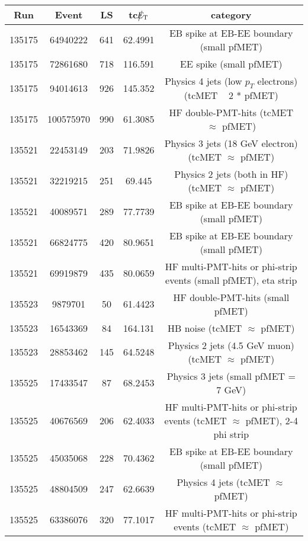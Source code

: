 \begin{table}[htbp]
  \begin{center}
    \begin{tabular}{|c|c|c|c|c|}
      \hline
      Run & Event & LS & tc$\big\slash\hspace{-1.6ex}{E_\text{T}}$ & category \\     
      \hline
      135175  & 64940222     & 641  &    62.4991 & EB spike at EB-EE boundary (small pfMET) \\
      135175  & 72861680     & 718  &    116.591 & EE spike (small pfMET) \\
      135175  & 94014613     & 926  &    145.352 & Physics 4 jets (low $p_T$ electrons) (tcMET ~ 2 * pfMET) \\
      135175  & 100575970    & 990  &    61.3085 & HF double-PMT-hits (tcMET $\approx$ pfMET) \\
      135521  & 22453149     & 203  &    71.9826 & Physics 3 jets (18 GeV electron)(tcMET $\approx$ pfMET) \\
      135521  & 32219215     & 251  &    69.445  & Physics 2 jets (both in HF) (tcMET $\approx$ pfMET) \\
      135521  & 40089571     & 289  &    77.7739 & EB spike at EB-EE boundary (small pfMET) \\
      135521  & 66824775     & 420  &    80.9651 & EB spike at EB-EE boundary (small pfMET) \\
      135521  & 69919879     & 435  &    80.0659 & HF multi-PMT-hits or phi-strip events (small pfMET), eta strip \\
      135523  & 9879701      & 50   &    61.4423 & HF double-PMT-hits (small pfMET) \\
      135523  & 16543369     & 84   &    164.131 & HB noise (tcMET $\approx$ pfMET) \\
      135523  & 28853462     & 145  &    64.5248 & Physics 2 jets (4.5 GeV muon) (tcMET $\approx$ pfMET) \\
      135525  & 17433547     & 87   &    68.2453 & Physics 3 jets (small pfMET = 7 GeV) \\ 
      135525  & 40676569     & 206  &    62.4033 & HF multi-PMT-hits or phi-strip events (tcMET $\approx$ pfMET), 2-4 phi strip \\
      135525  & 45035068     & 228  &    70.4362 & EB spike at EB-EE boundary (small pfMET) \\
      135525  & 48804509     & 247  &    62.6639 & Physics 4 jets (tcMET $\approx$ pfMET) \\
      135525  & 63386076     & 320  &    77.1017 & HF multi-PMT-hits or phi-strip events (tcMET $\approx$ pfMET) \\

\end{tabular}
\end{center}
\end{table}

